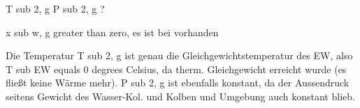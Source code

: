 T sub 2, g P sub 2, g ?

x sub w, g greater than zero, es ist bei vorhanden

Die Temperatur T sub 2, g ist genau die Gleichgewichtstemperatur des EW, also T sub EW equals 0 degrees Celsius, da therm. Gleichgewicht erreicht wurde (es fließt keine Wärme mehr). P sub 2, g ist ebenfalls konstant, da der Aussendruck seitens Gewicht des Wasser-Kol. und Kolben und Umgebung auch konstant blieb.